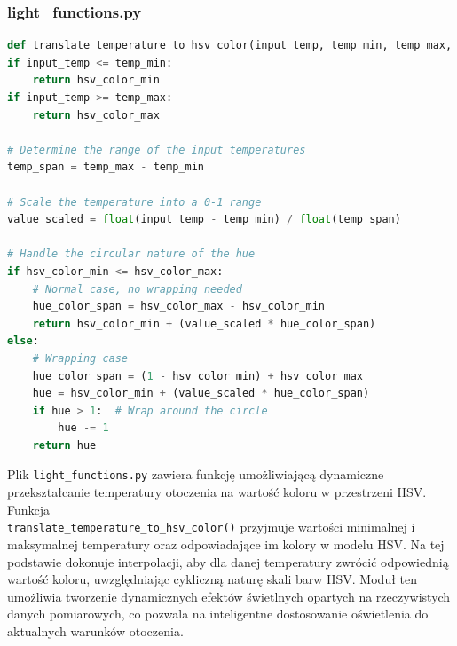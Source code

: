\documentclass[12pt]{article}
\begin{document}
\subsubsection{light\_functions.py}
\begin{lstlisting}[language=Python]
def translate_temperature_to_hsv_color(input_temp, temp_min, temp_max, hsv_color_min, hsv_color_max):
if input_temp <= temp_min:
    return hsv_color_min
if input_temp >= temp_max:
    return hsv_color_max

# Determine the range of the input temperatures
temp_span = temp_max - temp_min

# Scale the temperature into a 0-1 range
value_scaled = float(input_temp - temp_min) / float(temp_span)

# Handle the circular nature of the hue
if hsv_color_min <= hsv_color_max:
    # Normal case, no wrapping needed
    hue_color_span = hsv_color_max - hsv_color_min
    return hsv_color_min + (value_scaled * hue_color_span)
else:
    # Wrapping case
    hue_color_span = (1 - hsv_color_min) + hsv_color_max
    hue = hsv_color_min + (value_scaled * hue_color_span)
    if hue > 1:  # Wrap around the circle
        hue -= 1
    return hue
\end{lstlisting}
Plik \texttt{light\_functions.py} zawiera funkcję umożliwiającą dynamiczne przekształcanie temperatury otoczenia na wartość koloru w przestrzeni HSV. Funkcja\\ \texttt{translate\_temperature\_to\_hsv\_color()}
przyjmuje wartości minimalnej i maksymalnej temperatury oraz odpowiadające im kolory w modelu HSV. Na tej podstawie dokonuje interpolacji, aby dla danej temperatury zwrócić odpowiednią wartość koloru,
uwzględniając cykliczną naturę skali barw HSV. Moduł ten umożliwia tworzenie dynamicznych efektów świetlnych opartych na rzeczywistych danych pomiarowych, co pozwala na inteligentne dostosowanie
oświetlenia do aktualnych warunków otoczenia.
\end{document}
